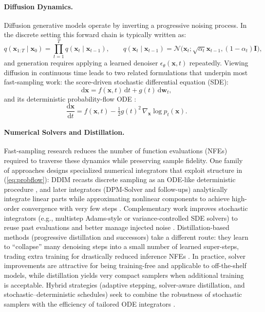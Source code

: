 \documentclass{llmxive}
\begin{document}
\paragraph{Diffusion Dynamics.}
Diffusion generative models operate by inverting a progressive noising process. In the discrete setting this forward chain is typically written as:
\begin{equation}
\label{eq:forward_process}
q(\mathbf{x}_{1:T}\mid\mathbf{x}_0)=\prod_{t=1}^T q(\mathbf{x}_t\mid\mathbf{x}_{t-1}),\qquad
q(\mathbf{x}_t\mid\mathbf{x}_{t-1})=\mathcal{N}\!\big(\mathbf{x}_t;\sqrt{\alpha_t}\mathbf{x}_{t-1},(1-\alpha_t)\mathbf{I}\big),
\end{equation}
and generation requires applying a learned denoiser $\epsilon_\theta(\mathbf{x},t)$ repeatedly. Viewing diffusion in continuous time leads to two related formulations that underpin most fast-sampling work: the score-driven stochastic differential equation (SDE):
\begin{equation}
\mathrm{d}\mathbf{x}=f(\mathbf{x},t)\,\mathrm{d}t + g(t)\,\mathrm{d}\mathbf{w}_t,
\end{equation}
and its deterministic probability-flow ODE \citep{songDDIM}:
\begin{equation}
\frac{\mathrm{d}\mathbf{x}}{\mathrm{d}t}=f(\mathbf{x},t)-\tfrac{1}{2}g(t)^2\,\nabla_{\mathbf{x}}\log p_t(\mathbf{x}).
\label{eq:probflow}
\end{equation}

\paragraph{Numerical Solvers and Distillation.}
Fast-sampling research reduces the number of function evaluations (NFEs) required to traverse these dynamics while preserving sample fidelity. One family of approaches designs specialized numerical integrators that exploit structure in (\ref{eq:probflow}): DDIM recasts discrete sampling as an ODE-like deterministic procedure \citep{songDDIM}, and later integrators (DPM-Solver and follow-ups) analytically integrate linear parts while approximating nonlinear components to achieve high-order convergence with very few steps \citep{lu2022dpm,lu2022dpm++,zheng2023dpmsolvervF,zhang2022fast}. Complementary work improves stochastic integrators (e.g., multistep Adams-style or variance-controlled SDE solvers) to reuse past evaluations and better manage injected noise \citep{xue2024sa,guo2024gaussian,xu2023restart}. Distillation-based methods (progressive distillation and successors) take a different route: they learn to ``collapse'' many denoising steps into a small number of learned super-steps, trading extra training for drastically reduced inference NFEs \citep{salimans2022progressive,meng2022on,yin2024improved}. In practice, solver improvements are attractive for being training-free and applicable to off-the-shelf models, while distillation yields very compact samplers when additional training is acceptable. Hybrid strategies (adaptive stepping, solver-aware distillation, and stochastic–deterministic schedules) seek to combine the robustness of stochastic samplers with the efficiency of tailored ODE integrators \citep{jolicoeur2021gotta,liu2022pseudo,karras2022elucidating}.
\end{document}
